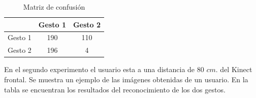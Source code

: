\begin{table}[h!] 
\begin{center}
\begin{tabular}{ r || c | c |} 
 
        & Gesto 1 & Gesto 2 \\ \hline \hline  
Gesto 1 & 190     &  110     \\ \hline  
Gesto 2 & 196     &  4     \\   

\end{tabular}
\end{center} 
\caption{Matriz de confusión}
\end{table}


En el segundo experimento el usuario esta a una distancia de $80$ $cm.$ del Kinect frontal. Se muestra un ejemplo de las imágenes obtenidas de un usuario. En la tabla se encuentran los resultados del reconocimiento de los dos gestos.   

